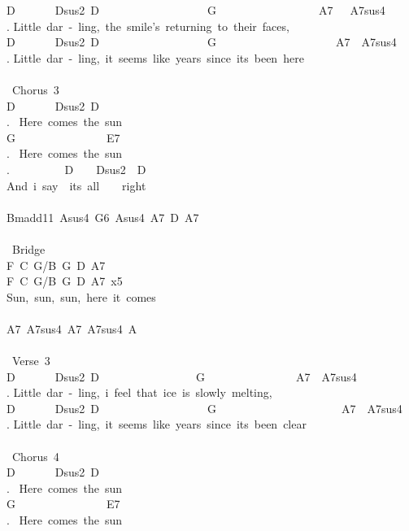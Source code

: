 {D\ \ \ \ \ \ \ Dsus2\ D\ \ \ \ \ \ \ \ \ \ \ \ \ \ \ \ \ \ \ G\ \ \ \ \ \ \ \ \ \ \ \ \ \ \ \ \ \ A7\ \ \ A7sus4\\
. Little\ dar\ -\ ling,\ the\ smile's\ returning\ to\ their\ faces,\\
D\ \ \ \ \ \ \ Dsus2\ D\ \ \ \ \ \ \ \ \ \ \ \ \ \ \ \ \ \ \ G\ \ \ \ \ \ \ \ \ \ \ \ \ \ \ \ \ \ \ \ \ A7\ \ A7sus4\\
. Little\ dar\ -\ ling,\ it\ seems\ like\ years\ since\ its\ been\ here\\
\\
\lbrack\ Chorus\ 3\rbrack\\
D\ \ \ \ \ \ \ Dsus2\ D\\
. \ Here\ comes\ the\ sun\\
G\ \ \ \ \ \ \ \ \ \ \ \ \ \ \ \ E7\\
. \ Here\ comes\ the\ sun\\
. \ \ \ \ \ \ \ \ \ D\ \ \ \ Dsus2\ \ D\\
And\ i\ say\ \ its\ all\ \ \ \ right\\
\\
Bmadd11\ Asus4\ G6\ Asus4\ A7\ D\ A7\\
\\
\lbrack\ Bridge\rbrack\\
F\ C\ G/B\ G\ D\ A7\\
F\ C\ G/B\ G\ D\ A7\ x5\\
Sun,\ sun,\ sun,\ here\ it\ comes\\
\\
A7\ A7sus4\ A7\ A7sus4\ A\\
\\
\lbrack\ Verse\ 3\rbrack\\
D\ \ \ \ \ \ \ Dsus2\ D\ \ \ \ \ \ \ \ \ \ \ \ \ \ \ \ \ G\ \ \ \ \ \ \ \ \ \ \ \ \ \ \ \ A7\ \ A7sus4\\
. Little\ dar\ -\ ling,\ i\ feel\ that\ ice\ is\ slowly\ melting,\\
D\ \ \ \ \ \ \ Dsus2\ D\ \ \ \ \ \ \ \ \ \ \ \ \ \ \ \ \ \ \ G\ \ \ \ \ \ \ \ \ \ \ \ \ \ \ \ \ \ \ \ \ \ A7\ \ A7sus4\\
. Little\ dar\ -\ ling,\ it\ seems\ like\ years\ since\ its\ been\ clear\\
\\
\lbrack\ Chorus\ 4\rbrack\\
D\ \ \ \ \ \ \ Dsus2\ D\\
. \ Here\ comes\ the\ sun\\
G\ \ \ \ \ \ \ \ \ \ \ \ \ \ \ \ E7\\
. \ Here\ comes\ the\ sun\\
}
